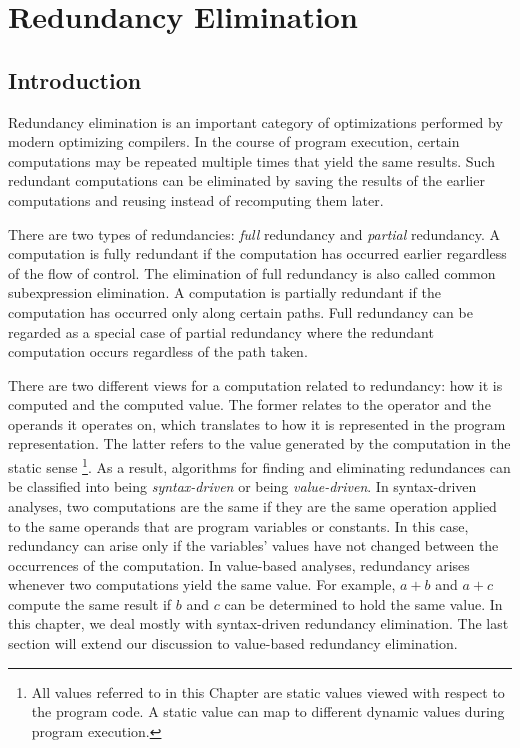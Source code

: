 \chapter{Redundancy Elimination}
\label{chapter:pre_not_helped}

\section{Introduction}
\label{section:Part3:Pre_not_helped:Intro}

Redundancy elimination is an important category of optimizations performed by modern optimizing compilers. 
In the course of program execution, certain computations may be repeated multiple times that yield the same results. 
Such redundant computations can be eliminated by saving the results of the earlier computations and reusing instead of recomputing them later.

There are two types of redundancies: 
\emph{full} redundancy and \emph{partial} redundancy. 
A computation is fully redundant if the computation has occurred earlier regardless of the flow of control. 
The elimination of full redundancy is also called common subexpression elimination. 
A computation is partially redundant if the computation has occurred only along certain paths. 
Full redundancy can be regarded as a special case of partial redundancy where the redundant computation occurs regardless of the path taken.

There are two different views for a computation related to redundancy: 
how it is computed and the computed value. 
The former relates to the operator and the operands it operates on, which translates to how it is represented in the program representation. 
The latter refers to the value generated by the computation in the static sense
\footnote{All values referred to in this Chapter are static values viewed with respect to the program code. 
  A static value can map to different dynamic values during program execution.}. 
As a result, algorithms for finding and eliminating redundances can be classified into being \emph{syntax-driven} or being \emph{value-driven}. 
In syntax-driven analyses, two computations are the same if they are the same operation applied to the same operands that are program variables or constants. 
In this case, redundancy can arise only if the variables' values have not changed between the occurrences of the computation. 
In value-based analyses, redundancy arises whenever two computations yield the same value. 
For example, $a+b$ and $a+c$ compute the same result if $b$ and $c$ can be determined to hold the same value. 
In this chapter, we deal mostly with syntax-driven redundancy elimination. 
The last section will extend our discussion to value-based redundancy elimination.

